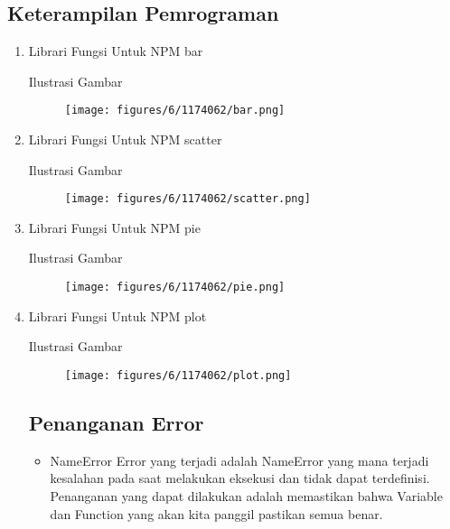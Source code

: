 \subsection{Keterampilan Pemrograman}
\begin{enumerate}

\item Librari Fungsi Untuk NPM bar 

Ilustrasi Gambar
	\begin{figure}[ht!]
	\texttt{[image: figures/6/1174062/bar.png]}
	\centering
	\end{figure}

\item Librari Fungsi Untuk NPM scatter

Ilustrasi Gambar
	\begin{figure}[ht!]
	\texttt{[image: figures/6/1174062/scatter.png]}
	\centering
	\end{figure}

\item Librari Fungsi Untuk NPM pie

Ilustrasi Gambar
	\begin{figure}[ht!]
	\texttt{[image: figures/6/1174062/pie.png]}
	\centering
	\end{figure}

\item Librari Fungsi Untuk NPM plot

Ilustrasi Gambar
	\begin{figure}[ht!]
	\texttt{[image: figures/6/1174062/plot.png]}
	\centering
	\end{figure}

\subsection{Penanganan Error}

\begin{itemize}

\item NameError
Error yang terjadi adalah NameError yang mana terjadi kesalahan pada saat melakukan eksekusi dan tidak dapat terdefinisi.
Penanganan yang dapat dilakukan adalah memastikan bahwa Variable dan Function yang akan kita panggil pastikan semua benar.\\


\end{itemize}
\end{enumerate}
